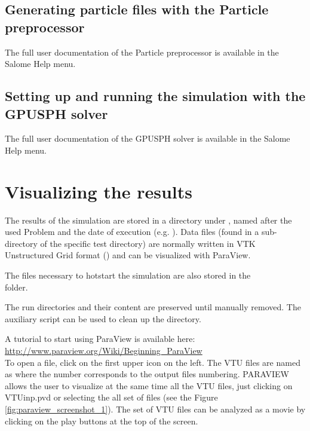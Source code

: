 \documentclass{../GPUSPHtemplate}
\begin{document}
\subsection{Generating particle files with the Particle preprocessor}

The full user documentation of the Particle preprocessor is available
in the Salome Help menu.

\subsection{Setting up and running the simulation with the GPUSPH solver}

The full user documentation of the GPUSPH solver is available
in the Salome Help menu.

\section{Visualizing the results}\label{sec:postprocess}

The results of the simulation are stored in a directory under
, named after the used Problem and the date of execution
(e.g. ). Data files (found in a
 sub-directory of the specific test directory) are normally
written in VTK Unstructured Grid format () and can be
visualized with ParaView.

The files necessary to hotstart the simulation are also stored
in the \\  folder.

The run directories and their content are preserved until manually
removed. The  auxiliary script can be used to clean
up the  directory.

A tutorial to start using ParaView is available here:\\
\url{http://www.paraview.org/Wiki/Beginning_ParaView}\\

To open a file, click on the first upper icon on the left. 
The VTU files are named as  where the number corresponds to
the output files numbering. 
PARAVIEW allows the user to visualize at the same time all the VTU files, 
just clicking on VTUinp.pvd or selecting the all set of  files
(see the Figure \ref{fig:paraview_screenshot_1}).
The set of VTU files can be analyzed as a movie by clicking on 
the play buttons at the top of the screen. 
\end{document}
